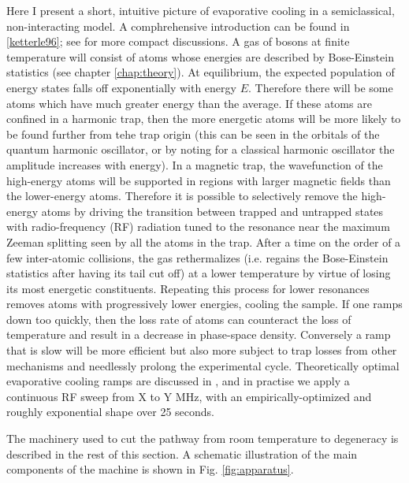 	Here I present a short, intuitive picture of evaporative cooling in a semiclassical, non-interacting model. 
	A comphrehensive introduction can be found in \ref{ketterle96}; see \cite{FootAtomic,PethickSmith} for more compact discussions. 
	A gas of bosons at finite temperature will consist of atoms whose energies are described by Bose-Einstein statistics (see chapter \ref{chap:theory}). 
	At equilibrium, the expected population of energy states falls off exponentially with energy $E$. 
	Therefore there will be some atoms which have much greater energy than the average. 
	If these atoms are confined in a harmonic trap, then the more energetic atoms will be more likely to be found further from tehe trap origin (this can be seen in the orbitals of the quantum harmonic oscillator, or by noting for a classical harmonic oscillator the amplitude increases with energy).
	In a magnetic trap, the wavefunction of the high-energy atoms will be supported in regions with larger magnetic fields than the lower-energy atoms.
	Therefore it is possible to selectively remove the high-energy atoms by driving the transition between trapped and untrapped states with radio-frequency (RF) radiation tuned to the resonance near the maximum Zeeman splitting seen by all the atoms in the trap.
	After a time on the order of a few inter-atomic collisions, the gas rethermalizes (i.e. regains the Bose-Einstein statistics after having its tail cut off) at a lower temperature by virtue of losing its most energetic constituents.
	Repeating this process for lower resonances removes atoms with progressively lower energies, cooling the sample.
	If one ramps down too quickly, then the loss rate of atoms can counteract the loss of temperature and result in a decrease in phase-space density.
	Conversely a ramp that is slow will be more efficient but also more subject to trap losses from other mechanisms and needlessly prolong the experimental cycle.
	Theoretically optimal evaporative cooling ramps are discussed in \cite{Ketterle96}, and in practise we apply a continuous RF sweep from X to Y MHz, with an empirically-optimized and roughly exponential shape over 25 seconds.

	The machinery used to cut the pathway from room temperature to degeneracy is described in the rest of this section. A schematic illustration of the main components of the machine is shown in Fig. \ref{fig:apparatus}.


	

	
